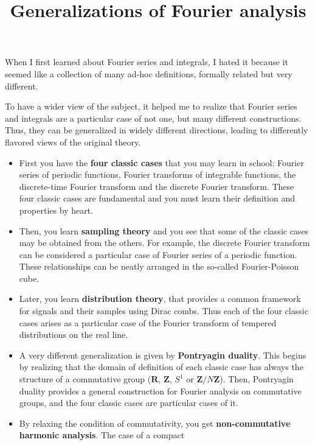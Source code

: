 \title{Generalizations of Fourier analysis}

When I first learned about Fourier series and integrals, I hated it
because it seemed like a collection of many ad-hoc definitions,
formally related but very different.

To have a wider view of the subject, it helped me to realize that
Fourier series and integrals are a particular case of not one,
but many different constructions.  Thus, they can be generalized in
widely different directions, leading to differently flavored views of
the original theory.

\newcommand{\R}{\mathbf{R}}
\newcommand{\Z}{\mathbf{Z}}
\newcommand{\Q}{\mathbf{Q}}
\newcommand{\C}{\mathbf{C}}
\newcommand{\U}{\mathbf{U}}
\newcommand{\T}{\mathbf{T}}
\newcommand{\ud}{\mathrm{d}}

\begin{itemize}
	\item First you have the {\bf four classic cases} that you may learn in
		school: Fourier series of periodic functions, Fourier
		transforms of integrable functions, the discrete-time Fourier
		transform and the discrete Fourier transform.
		These four classic cases are fundamental and you must learn
		their definition and properties by heart.
	\item Then, you learn {\bf sampling theory} and you see that
		some of the classic cases may be obtained from the others.
		For example, the discrete Fourier transform can be
		considered a particular case of Fourier series of a
		periodic function.
		These relationships can be neatly arranged in the
		so-called Fourier-Poisson cube.
	\item Later, you learn {\bf distribution theory}, that
		provides a common framework for signals and their
		samples using Dirac combs.  Thus each of the four
		classic cases arises as a particular case of the
		Fourier transform of tempered distributions on the
		real line.
	\item A very different generalization is given by {\bf
		Pontryagin duality}.  This begins by realizing that
		the domain of definition of each classic case has
		always the structure of a commutative group ($\R$,
		$\Z$, $S^1$ or $\Z/N\Z$).  Then, Pontryagin duality
		provides a general construction for Fourier analysis
		on commutative groups, and the four classic cases
		are particular cases of it.
	\item By relaxing the condition of commutativity, you get {\bf
		non-commutative harmonic analysis}.  The case of a compact

\end{itemize}
